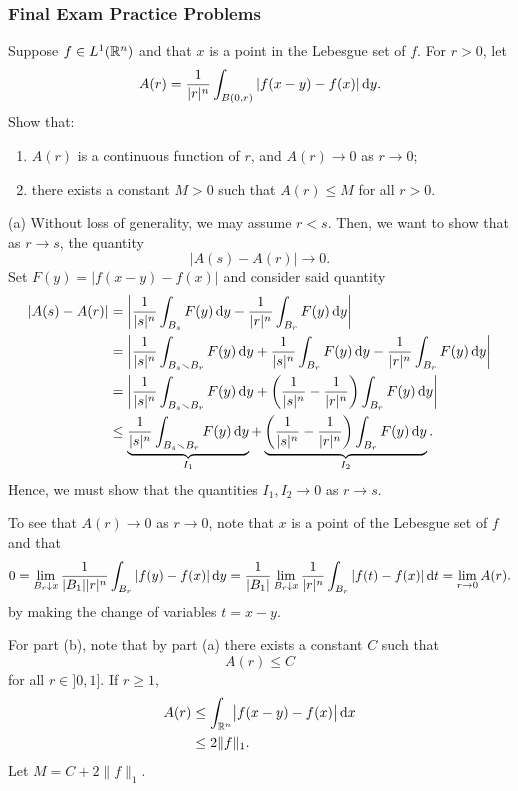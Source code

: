 \subsubsection{Final Exam Practice Problems}
\setcounter{exercise}{0}
\setcounter{equation}{0}

\begin{problem}
  Suppose \(f\in L^1(\mathbb{R}^n)\) and that \(x\) is a point in the Lebesgue
  set of \(f\). For \(r>0\), let
  \[
    A(r)=\frac{1}{|r|^n}\int_{B(0,r)}|f( x - y )-f( x )|\mathop{}\!\mathrm{d} y .
  \]
  Show that:
  \begin{enumerate}[label=(\alph*)]
    \hfill
  \item \(A(r)\) is a continuous function of \(r\), and \(A(r)\to 0\) as
    \(r\to 0\);
  \item there exists a constant \(M>0\) such that \(A(r)\leq M\) for all
    \(r>0\).
  \end{enumerate}
\end{problem}
\begin{solution}
  (a) Without loss of generality, we may assume \(r<s\). Then, we want to
  show that as \(r\to s\), the quantity
  \[
    |A(s)-A(r)|\longrightarrow 0.
  \]
  Set \(F( y )= |f( x - y )-f( x )|\) and consider said quantity
  \begin{align*}
    |A(s)-A(r)|
    &=\left|
      \frac{1}{|s|^n}\int_{B_s}F( y )\diff y
      -
      \frac{1}{|r|^n}\int_{B_r}F( y )\diff y
      \right|\\
    &=\left|
      \frac{1}{|s|^n}\int_{B_s\setminus B_r}F( y )\diff y +
      \frac{1}{|s|^n}\int_{B_r}F( y )\diff y -
      \frac{1}{|r|^n}\int_{B_r}F( y )\diff y
      \right|\\
    &=\left|
      \frac{1}{|s|^n}\int_{B_s\setminus B_r}F( y )\diff y
      +\left(\frac{1}{|s|^n}-\frac{1}{|r|^n}\right)\int_{B_r}F( y )\diff y
      \right|\\
    &\leq
      \underbrace{\frac{1}{|s|^n}\int_{B_s\setminus B_r}F( y )\diff y }_{I_1}
      +\underbrace{\left(\frac{1}{|s|^n}-\frac{1}{|r|^n}\right)\int_{B_r}F( y )\diff y }_{I_2}.
  \end{align*}
  Hence, we must show that the quantities \(I_1,I_2\to 0\) as \(r\to s\).

  To see that \(A(r)\to 0\) as \(r\to 0\), note that \(x\) is a point of
  the Lebesgue set of \(f\) and that
  \[
    0=\lim_{B_r\downarrow x }\frac{1}{|B_1||r|^n}\int_{B_r}|f( y )-f( x
    )|\mathop{}\!\mathrm{d} y =\frac{1}{|B_1|}\lim_{B_r\downarrow x
    }\frac{1}{|r|^n}\int_{B_r}|f( t )-f( x )|\mathop{}\!\mathrm{d} t =\lim_{r\to 0}A(r).
  \]
  by making the change of variables \(t=x-y\).

  For part (b), note that by part (a) there exists a constant \(C\) such
  that
  \[
    A(r)\leq C
  \]
  for all \(r\in]0,1]\). If \(r\geq 1\),
  \begin{align*}
    A(r)
    &\leq\int_{\mathbb{R}^n}\bigl|f(x-y)-f(x)\bigr|\mathop{}\!\mathrm{d} x\\
    &\leq 2\|f\|_1.
  \end{align*}
  Let \(M=C+2\|f\|_1\).
\end{solution}

